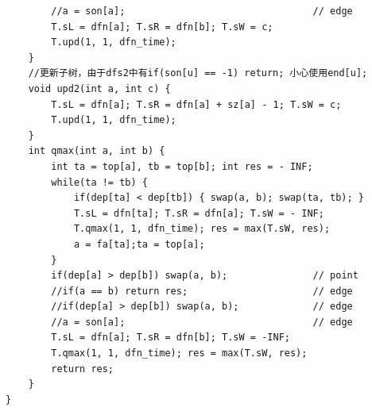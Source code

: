 \documentclass[10pt]{ctexart}
\begin{document}
{\begin{lstlisting}
        //a = son[a];                                 // edge
        T.sL = dfn[a]; T.sR = dfn[b]; T.sW = c;
        T.upd(1, 1, dfn_time);
    }
    //更新子树，由于dfs2中有if(son[u] == -1) return; 小心使用end[u];
    void upd2(int a, int c) {
        T.sL = dfn[a]; T.sR = dfn[a] + sz[a] - 1; T.sW = c;
        T.upd(1, 1, dfn_time);
    }
    int qmax(int a, int b) {
        int ta = top[a], tb = top[b]; int res = - INF;
        while(ta != tb) {
            if(dep[ta] < dep[tb]) { swap(a, b); swap(ta, tb); }
            T.sL = dfn[ta]; T.sR = dfn[a]; T.sW = - INF;
            T.qmax(1, 1, dfn_time); res = max(T.sW, res);
            a = fa[ta];ta = top[a];
        }
        if(dep[a] > dep[b]) swap(a, b);               // point
        //if(a == b) return res;                      // edge
        //if(dep[a] > dep[b]) swap(a, b);             // edge
        //a = son[a];                                 // edge
        T.sL = dfn[a]; T.sR = dfn[b]; T.sW = -INF;
        T.qmax(1, 1, dfn_time); res = max(T.sW, res);
        return res;
    }
}
\end{lstlisting}
}
\end{document}
